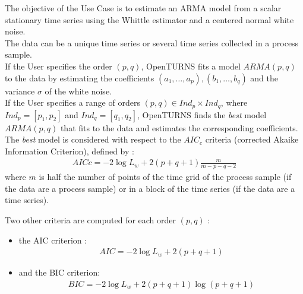 \renewcommand{\filename}{docUC_StocProc_ARMA_Estimation_Whittle.tex}
\renewcommand{\filetitle}{UC : Estimation of a scalar ARMA process}

\HeaderIIILevel

\label{ARMAEstimationWhittle}




The objective of the Use Case is to estimate an ARMA model from a scalar stationary time series using the Whittle estimator and a centered normal white noise.\\

The data can be a unique time series or several time series collected in a process sample. \\

If the User specifies the order $(p,q)$, OpenTURNS fits a model $ARMA(p,q)$ to the data by estimating the coefficients $(a_1, \dots, a_p), (b_1, \dots, b_q)$ and the variance $\sigma$ of the white noise.\\
If the User specifies a range of orders $(p,q) \in Ind_p \times Ind_q$, where $Ind_p = [p_1, p_2]$ and $Ind_q = [q_1, q_2]$, OpenTURNS finds the \emph{best} model $ARMA(p,q)$ that fits to the data and estimates the corresponding coefficients. The \emph{best} model is considered with respect to  the $AIC_c$ criteria (corrected Akaike Information Criterion), defined by :
\begin{align*}
  AICc = -2\log L_w + 2(p + q + 1)\frac{m}{m - p - q - 2}
\end{align*}
where $m$ is half the number of points of the time grid of the process sample (if the data are a process sample) or in a block of the time series (if the data are a time series).

Two other criteria are  computed for each order $(p,q)$ :
\begin{itemize}
\item  the AIC criterion :
  \begin{align*}
    AIC = -2\log L_w + 2(p + q + 1)
  \end{align*}
\item and the BIC criterion:
  \begin{align*}
    BIC = -2\log L_w + 2(p + q + 1)\log(p + q + 1)
  \end{align*}
\end{itemize}

